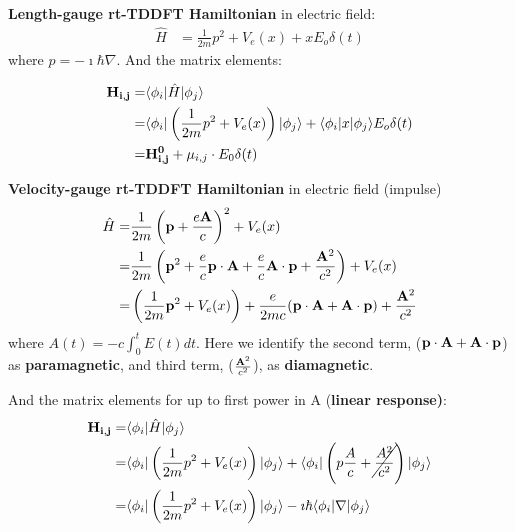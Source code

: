 \documentclass[11pt]{article}
\begin{document}
{\bf Length-gauge rt-TDDFT Hamiltonian}  in   electric field:
\begin{align}
 \hat H  &=  \frac{1}{2m} p^2  + V_{e}(x)  +  x E_o\delta(t) 
\end{align}
where  $p= -\imath  \hbar \nabla$.
And the matrix elements:

\begin{align}
 \vb{H_{i,j}} =& \langle \phi_i| \hat H| \phi_j \rangle  \\  \nonumber
        = & \langle \phi_i| \left( \frac{1}{2m} p^2  + V_{e}(x)  \right)  |\phi_j\rangle  + 
           \langle \phi_i|   x   |\phi_j\rangle E_o\delta(t)   \\ \nonumber
         =&   \vb{  H_{i,j}^0 }  + \vb{ \mu}_{i,j}  \cdot E_0\delta(t)
\end{align}

{\bf Velocity-gauge rt-TDDFT Hamiltonian}  in electric field (impulse)
\begin{align}
 \hat H  =&  \frac{1}{2m} \left(\vb p +  \frac{e \vb A}{c}\right)^2  + V_{e}(x)   \\
    = &  \frac{1}{2m} \left(\vb p^2  + \frac{e}{c} \vb{ p \cdot A}  +   \frac{e}{c} \vb{ A \cdot p} +  \frac{\vb A^2}{c^2}  \right)  + V_e(x)  \\
    =&   \left( \frac{1}{2m} \vb p^2   + V_e(x)  \right)  + 
    \frac{e}{2m c} (\vb{  p \cdot A + A \cdot p}) +  \frac{\vb A^2}{c^2} 
\end{align}
where   $A(t)   = -c \int_0^t E(t)dt$.  Here we identify the second term, ($\vb{  p  \cdot A  +A \cdot p}$) as {\bf paramagnetic}, and third  term, ($  \frac{\vb A^2}{c^2}$),  as   {\bf diamagnetic}.

And the matrix elements for up to first power in A  ({\bf linear response)}:
\begin{align}
 \vb{H_{i,j}} =& \langle \phi_i| \hat H| \phi_j \rangle  \\  \nonumber
        = & \langle \phi_i| \left( \frac{1}{2m} p^2  + V_{e}(x)  \right)  |\phi_j\rangle  + 
           \langle \phi_i|  \left( p \frac{A}{c}  +  \cancel{\frac{A^2}{c^2} } \right)  |\phi_j\rangle \\ \nonumber
     =&     \langle \phi_i| \left( \frac{1}{2m} p^2  + V_{e}(x)  \right)  |\phi_j\rangle  - \imath \hbar    \langle \phi_i|  \nabla |\phi_j \rangle 
\end{align}

\end{document}
